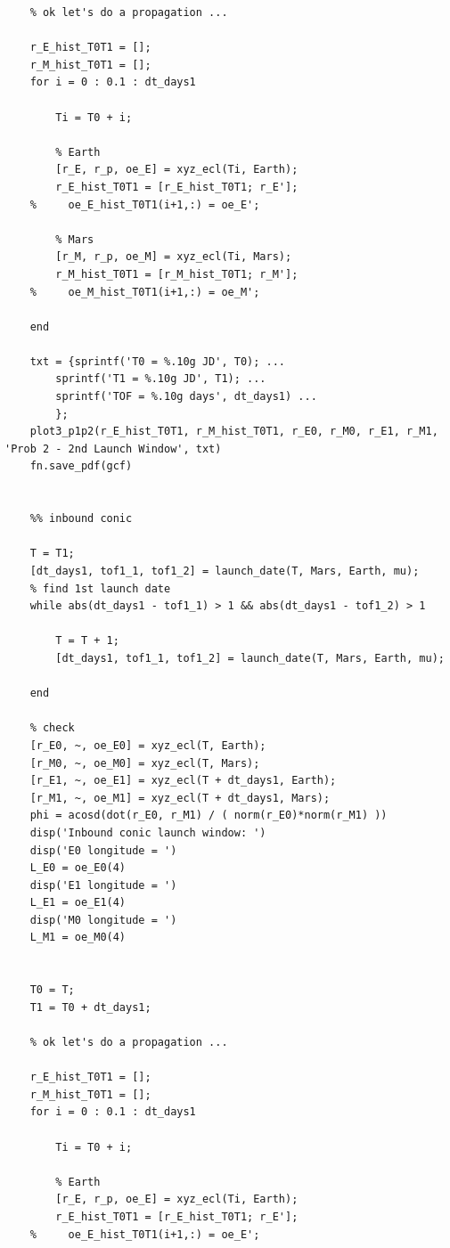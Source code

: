 \documentclass[conf]{new-aiaa}
\begin{document}
\begin{lstlisting}
    % ok let's do a propagation ... 
    
    r_E_hist_T0T1 = []; 
    r_M_hist_T0T1 = []; 
    for i = 0 : 0.1 : dt_days1
        
        Ti = T0 + i; 
        
        % Earth 
        [r_E, r_p, oe_E] = xyz_ecl(Ti, Earth); 
        r_E_hist_T0T1 = [r_E_hist_T0T1; r_E']; 
    %     oe_E_hist_T0T1(i+1,:) = oe_E'; 
        
        % Mars 
        [r_M, r_p, oe_M] = xyz_ecl(Ti, Mars); 
        r_M_hist_T0T1 = [r_M_hist_T0T1; r_M']; 
    %     oe_M_hist_T0T1(i+1,:) = oe_M'; 
        
    end 
    
    txt = {sprintf('T0 = %.10g JD', T0); ... 
        sprintf('T1 = %.10g JD', T1); ... 
        sprintf('TOF = %.10g days', dt_days1) ... 
        }; 
    plot3_p1p2(r_E_hist_T0T1, r_M_hist_T0T1, r_E0, r_M0, r_E1, r_M1, 'Prob 2 - 2nd Launch Window', txt)
    fn.save_pdf(gcf)
    
    
    %% inbound conic 
    
    T = T1;
    [dt_days1, tof1_1, tof1_2] = launch_date(T, Mars, Earth, mu); 
    % find 1st launch date 
    while abs(dt_days1 - tof1_1) > 1 && abs(dt_days1 - tof1_2) > 1
    
        T = T + 1; 
        [dt_days1, tof1_1, tof1_2] = launch_date(T, Mars, Earth, mu);  
        
    end 
    
    % check 
    [r_E0, ~, oe_E0] = xyz_ecl(T, Earth); 
    [r_M0, ~, oe_M0] = xyz_ecl(T, Mars); 
    [r_E1, ~, oe_E1] = xyz_ecl(T + dt_days1, Earth); 
    [r_M1, ~, oe_M1] = xyz_ecl(T + dt_days1, Mars); 
    phi = acosd(dot(r_E0, r_M1) / ( norm(r_E0)*norm(r_M1) ))
    disp('Inbound conic launch window: ')
    disp('E0 longitude = ') 
    L_E0 = oe_E0(4)
    disp('E1 longitude = ') 
    L_E1 = oe_E1(4)
    disp('M0 longitude = ') 
    L_M1 = oe_M0(4)
    
    
    T0 = T; 
    T1 = T0 + dt_days1; 
    
    % ok let's do a propagation ... 
    
    r_E_hist_T0T1 = []; 
    r_M_hist_T0T1 = []; 
    for i = 0 : 0.1 : dt_days1
        
        Ti = T0 + i; 
        
        % Earth 
        [r_E, r_p, oe_E] = xyz_ecl(Ti, Earth); 
        r_E_hist_T0T1 = [r_E_hist_T0T1; r_E']; 
    %     oe_E_hist_T0T1(i+1,:) = oe_E'; 
        

\end{lstlisting}
\end{document}

